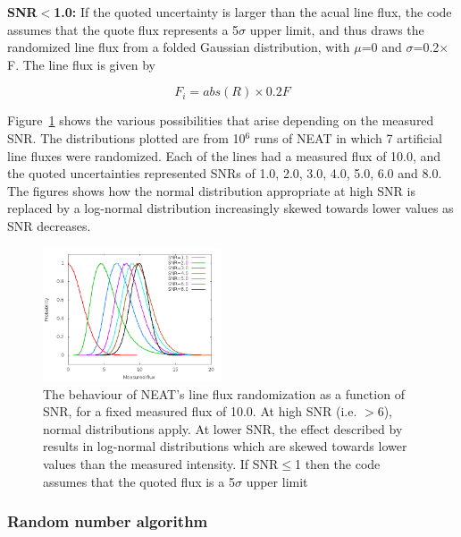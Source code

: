 \documentclass[useAMS,usenatbib]{mn2e}
\begin{document}
{\bf SNR$<$1.0: } If the quoted uncertainty is larger than the acual line flux, the code assumes that the quote flux represents a 5$\sigma$ upper limit, and thus draws the randomized line flux from a folded Gaussian distribution, with $\mu$=0 and $\sigma$=0.2$\times$F.  The line flux is given by

\begin{equation}
F_i = abs(R)\times0.2F
\end{equation}

Figure~\ref{distributions} shows the various possibilities that arise depending on the measured SNR.  The distributions plotted are from 10$^6$ runs of NEAT in which 7 artificial line fluxes were randomized.  Each of the lines had a measured flux of 10.0, and the quoted uncertainties represented SNRs of 1.0, 2.0, 3.0, 4.0, 5.0, 6.0 and 8.0.  The figures shows how the normal distribution appropriate at high SNR is replaced by a log-normal distribution increasingly skewed towards lower values as SNR decreases.

\begin{figure}
\includegraphics[width=0.47\textwidth]{figures/distributions_2.png}
\caption{The behaviour of NEAT's line flux randomization as a function of SNR, for a fixed measured flux of 10.0.  At high SNR (i.e. $>$6), normal distributions apply.  At lower SNR, the effect described by \citet{1994A&A...287..676R} results in log-normal distributions which are skewed towards lower values than the measured intensity.  If SNR$\leq$1 then the code assumes that the quoted flux is a 5$\sigma$ upper limit}
\label{distributions}
\end{figure}

\subsubsection{Random number algorithm}
\end{document}
